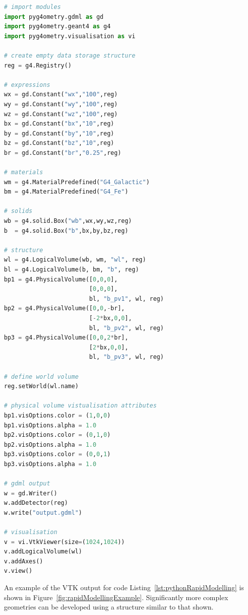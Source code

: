 \documentclass[final,5p,times,twocolumn]{elsarticle}
\newcommand{\PYGEOMETRY}{\textsc{Pyg4ometry}}
\begin{document}
\begin{lstlisting}[caption={A simple Python script using \PYGEOMETRY{} to create a simple Geant4 geometry.},label={lst:pythonRapidModelling}, language=Python]
# import modules 
import pyg4ometry.gdml as gd
import pyg4ometry.geant4 as g4
import pyg4ometry.visualisation as vi

# create empty data storage structure
reg = g4.Registry()

# expressions
wx = gd.Constant("wx","100",reg)
wy = gd.Constant("wy","100",reg)
wz = gd.Constant("wz","100",reg)
bx = gd.Constant("bx","10",reg)
by = gd.Constant("by","10",reg)
bz = gd.Constant("bz","10",reg)
br = gd.Constant("br","0.25",reg)

# materials
wm = g4.MaterialPredefined("G4_Galactic")
bm = g4.MaterialPredefined("G4_Fe")

# solids
wb = g4.solid.Box("wb",wx,wy,wz,reg)
b  = g4.solid.Box("b",bx,by,bz,reg)

# structure
wl = g4.LogicalVolume(wb, wm, "wl", reg)
bl = g4.LogicalVolume(b, bm, "b", reg)
bp1 = g4.PhysicalVolume([0,0,0],
                        [0,0,0],
                        bl, "b_pv1", wl, reg)
bp2 = g4.PhysicalVolume([0,0,-br],
                        [-2*bx,0,0],
                        bl, "b_pv2", wl, reg)
bp3 = g4.PhysicalVolume([0,0,2*br],
                        [2*bx,0,0],
                        bl, "b_pv3", wl, reg)

# define world volume
reg.setWorld(wl.name)

# physical volume vistualisation attributes
bp1.visOptions.color = (1,0,0)
bp1.visOptions.alpha = 1.0
bp2.visOptions.color = (0,1,0)
bp2.visOptions.alpha = 1.0
bp3.visOptions.color = (0,0,1)
bp3.visOptions.alpha = 1.0

# gdml output
w = gd.Writer()
w.addDetector(reg)
w.write("output.gdml")

# visualisation
v = vi.VtkViewer(size=(1024,1024))
v.addLogicalVolume(wl)
v.addAxes()
v.view()
\end{lstlisting}

An example of the VTK output for code
Listing~\ref{lst:pythonRapidModelling} is shown in
Figure~\ref{fig:rapidModellingExample}. Significantly more complex
geometries can be developed using a structure similar to that shown.
\end{document}
